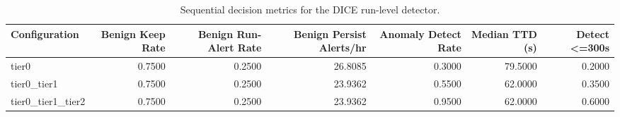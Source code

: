 \begin{table}[t]
\centering
\caption{Sequential decision metrics for the DICE run-level detector.}
\label{tab:dice_sequential_metrics}
\footnotesize
\begin{tabular}{lrrrrrr}
\toprule
Configuration & Benign Keep Rate & Benign Run-Alert Rate & Benign Persist Alerts/hr & Anomaly Detect Rate & Median TTD (s) & Detect <=300s \\
\midrule
tier0 & 0.7500 & 0.2500 & 26.8085 & 0.3000 & 79.5000 & 0.2000 \\
tier0_tier1 & 0.7500 & 0.2500 & 23.9362 & 0.5500 & 62.0000 & 0.3500 \\
tier0_tier1_tier2 & 0.7500 & 0.2500 & 23.9362 & 0.9500 & 62.0000 & 0.6000 \\
\bottomrule
\end{tabular}

\end{table}
